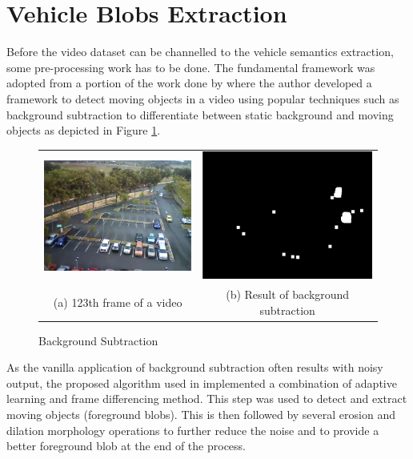 \section{Vehicle Blobs Extraction}
\label{subsection:fundamental}

Before the video dataset can be channelled to the vehicle semantics extraction, some pre-processing work has to be done. The fundamental framework was adopted from a portion of the work done by \cite{lim2017} where the author developed a framework to detect moving objects in a video using popular techniques such as background subtraction to differentiate between static background and moving objects as depicted in Figure \ref{fig:bgs}. 

\begin{figure}[htb!]
  \centering
\begin{tabular}{cc}
 \includegraphics[width=0.4\linewidth]{image/general/bgs1.png} &  \includegraphics[width=0.4\linewidth]{image/general/bgs2.png}  \\ 
(a) 123th frame of a video & (b) Result of background subtraction \\
\end{tabular}
\caption{Background Subtraction} 
\label{fig:bgs}
\end{figure}

As the vanilla application of background subtraction often results with noisy output, the proposed algorithm used in \cite{lim2017} implemented a combination of adaptive learning and frame differencing method. This step was used to detect and extract moving objects (foreground blobs). This is then followed by several erosion and dilation morphology operations to further reduce the noise and to provide a better foreground blob at the end of the process.

